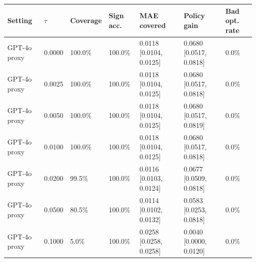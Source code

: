 \begin{tabular}{lllllll}
\toprule
Setting & $\tau$ & Coverage & Sign acc. & MAE covered & Policy gain & Bad opt. rate \\
\midrule
GPT-4o proxy & 0.0000 & 100.0\% & 100.0\% & 0.0118 [0.0104, 0.0125] & 0.0680 [0.0517, 0.0818] & 0.0\% \\
GPT-4o proxy & 0.0025 & 100.0\% & 100.0\% & 0.0118 [0.0104, 0.0125] & 0.0680 [0.0517, 0.0818] & 0.0\% \\
GPT-4o proxy & 0.0050 & 100.0\% & 100.0\% & 0.0118 [0.0104, 0.0125] & 0.0680 [0.0517, 0.0819] & 0.0\% \\
GPT-4o proxy & 0.0100 & 100.0\% & 100.0\% & 0.0118 [0.0104, 0.0125] & 0.0680 [0.0517, 0.0818] & 0.0\% \\
GPT-4o proxy & 0.0200 & 99.5\% & 100.0\% & 0.0116 [0.0103, 0.0124] & 0.0677 [0.0509, 0.0818] & 0.0\% \\
GPT-4o proxy & 0.0500 & 80.5\% & 100.0\% & 0.0114 [0.0102, 0.0132] & 0.0583 [0.0253, 0.0818] & 0.0\% \\
GPT-4o proxy & 0.1000 & 5.0\% & 100.0\% & 0.0258 [0.0258, 0.0258] & 0.0040 [0.0000, 0.0120] & 0.0\% \\
\bottomrule
\end{tabular}
